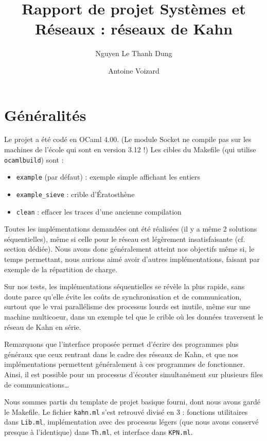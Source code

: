 \documentclass[a4paper, 11pt]{article}
\title{Rapport de projet Systèmes et Réseaux : réseaux de Kahn}
\author{Nguyen Le Thanh Dung \and Antoine Voizard}
\begin{document}
\maketitle

\section*{Généralités}

Le projet a été codé en OCaml 4.00. (Le module Socket ne compile pas
sur les machines de l'école qui sont en version 3.12 !) Les cibles du
Makefile (qui utilise \texttt{ocamlbuild}) sont : 
\begin{itemize}
\item \texttt{example} (par défaut) : exemple simple affichant les
  entiers
\item \texttt{example\_sieve} : crible d'\'Eratosthène
\item \texttt{clean} : effacer les traces d'une ancienne compilation
\end{itemize}

Toutes les implémentations demandées ont été réalisées (il y a même 2
solutions séquentielles), même si celle pour le réseau est légèrement
insatisfaisante (cf. section dédiée). Nous avons donc généralement
atteint nos objectifs même si, le temps permettant, nous aurions aimé
avoir d'autres implémentations, faisant par exemple de la répartition
de charge.

Sur nos tests, les implémentations séquentielles se révèle la plus rapide,
sans doute parce qu'elle évite les coûts de synchronisation et de
communication, surtout que le \og vrai \fg parallélisme des processus lourds
est inutile, même sur une machine multicoeur, dans un exemple tel que
le crible où les données traversent le réseau de Kahn en série.

Remarquons que l'interface proposée permet d'écrire des programmes plus
généraux que ceux rentrant dans le cadre des réseaux de Kahn, et que
nos implémentations permettent généralement à ces programmes de
fonctionner. Ainsi, il est possible pour un processus d'écouter
simultanément sur plusieurs files de communications\ldots

Nous sommes partis du template de projet basique fourni, dont nous
avons gardé le Makefile. Le fichier \texttt{kahn.ml} s'est retrouvé
divisé en 3 : fonctions utilitaires dans \texttt{Lib.ml},
implémentation avec des processus légers (que nous avons conservé presque à
l'identique) dans \texttt{Th.ml}, et interface dans \texttt{KPN.ml}.
\end{document}

